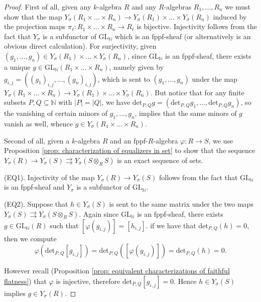 \documentclass[oneside,11pt]{amsart}
\newcommand{\nn}{\ensuremath{\mathbb{N}}}
\newcommand{\GL}{\ensuremath{\text{GL}}}
\theoremstyle{definition}
\newtheorem{proof techniques}{Proof Techniques}
\begin{document}
\begin{proof}
First of all, given any $k$-algebra $R$ and any $R$-algebras $R_1, \ldots, R_n$ we must show that the map $Y_\sigma(R_1 \times \ldots \times R_n) \to Y_\sigma(R_1) \times \ldots \times Y_\sigma(R_n)$ induced by the projection maps $\pi_\ell : R_1 \times \ldots \times R_n \to R_\ell$ is bijective. Injectivity follows from the fact that $Y_\sigma$ is a subfunctor of $\GL_\nn$ which is an fppf-sheaf (or alternatively is an obvious direct calculation). For surjectivity, given $(g_1, \ldots, g_n) \in Y_\sigma(R_1) \times \ldots \times Y_\sigma(R_n)$, since $\GL_\nn$ is an fppf-sheaf, there exists a unique $g \in \GL_\nn( R_1 \times \ldots \times R_n)$, namely given by $g_{i , j} = ( (g_1)_{i, j} , \ldots, (g_n)_{i , j})$, which is sent to $(g_1, \ldots, g_n)$ under the map $Y_\sigma(R_1 \times \ldots \times R_n) \to Y_\sigma(R_1) \times \ldots \times Y_\sigma(R_n)$. But notice that for any finite subsets $P, Q \subseteq \nn$ with $|P| = |Q|$, we have $\text{det}_{P , Q} g = ( \text{det}_{P , Q} g_1, \ldots, \text{det}_{P , Q} g_n)$, so the vanishing of certain minors of $g_1, \ldots, g_n$, implies that the same minors of $g$ vanish as well, whence $g \in Y_\sigma(R_1 \times \ldots \times R_n)$. 

Second of all, given a $k$-algebra $R$ and an fppf-$R$-algebra $\varphi :  R \to S$, we use Proposition \ref{prop: characterization of equalizers in set} to show that the sequence $Y_\sigma(R) \to Y_\sigma(S) \rightrightarrows Y_\sigma(S \otimes_R S)$ is an exact sequence of sets. 

(EQ1). Injectivity of the map $Y_\sigma(R) \to Y_\sigma(S)$ follows from the fact that $\GL_\nn$ is an fppf-sheaf and $Y_\sigma$ is a subfunctor of $\GL_\nn$. 

(EQ2). Suppose that $h \in Y_\sigma(S)$ is sent to the same matrix under the two maps $Y_\sigma(S) \rightrightarrows Y_\sigma(S \otimes_R S)$. Again since $\GL_\nn$ is an fppf-sheaf, there exists $g \in \GL_\nn(R)$ such that $[\varphi(g_{i , j})] = [h_{i , j}]$. if we have that $\text{det}_{P , Q} (h) = 0$, then we compute
\begin{equation*}
\varphi(\text{det}_{P , Q} [g_{i , j}]) = \text{det}_{P , Q} ( [\varphi (g_{i , j} ) ] ) = \text{det}_{P , Q} (h) = 0. 
\end{equation*}

However recall (Proposition \ref{prop: equivalent characterizations of faithful flatness}) that $\varphi$ is injective, therefore $\text{det}_{P , Q} [g_{i , j}] = 0$. Hence $h \in Y_\sigma(S)$ implies $g \in Y_\sigma(R)$. 
\end{proof}
\end{document}
